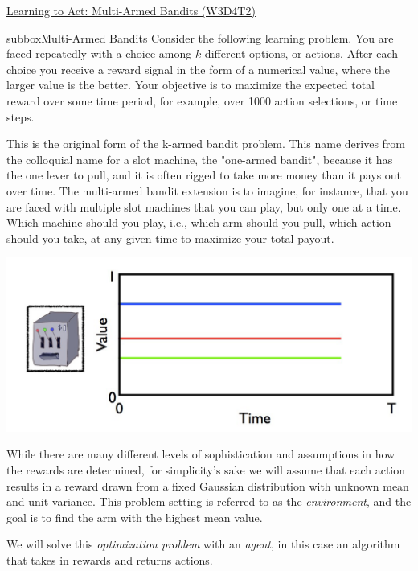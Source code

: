 \begin{textbox}{\href{https://compneuro.neuromatch.io/tutorials/W3D4_ReinforcementLearning/student/W3D4_Tutorial2.html}{Learning to Act: Multi-Armed Bandits (W3D4T2)} }
\begin{subbox}{subbox}{Multi-Armed Bandits}
\scriptsize
Consider the following learning problem. You are faced repeatedly with a choice among $k$ different options, or actions. After each choice you receive a reward signal in the form of a numerical value, where the larger value is the better. Your objective is to maximize the expected total reward over some time period, for example, over 1000 action selections, or time steps.

This is the original form of the k-armed bandit problem. This name derives from the colloquial name for a slot machine, the "one-armed bandit", because it has the one lever to pull, and it is often rigged to take more money than it pays out over time. The multi-armed bandit extension is to imagine, for instance, that you are faced with multiple slot machines that you can play, but only one at a time. Which machine should you play, i.e., which arm should you pull, which action should you take, at any given time to maximize your total payout.


\begin{center}
    
\includegraphics[scale=0.18]{Figures/RL/RL_Figure7.png}
\end{center}
While there are many different levels of sophistication and assumptions in how the rewards are determined, for simplicity's sake we will assume that each action results in a reward drawn from a fixed Gaussian distribution with unknown mean and unit variance. This problem setting is referred to as the \textit{environment}, and the goal is to find the arm with the highest mean value.

We will solve this \textit{optimization problem} with an \textit{agent}, in this case an algorithm that takes in rewards and returns actions.

\end{subbox}
\end{textbox}
